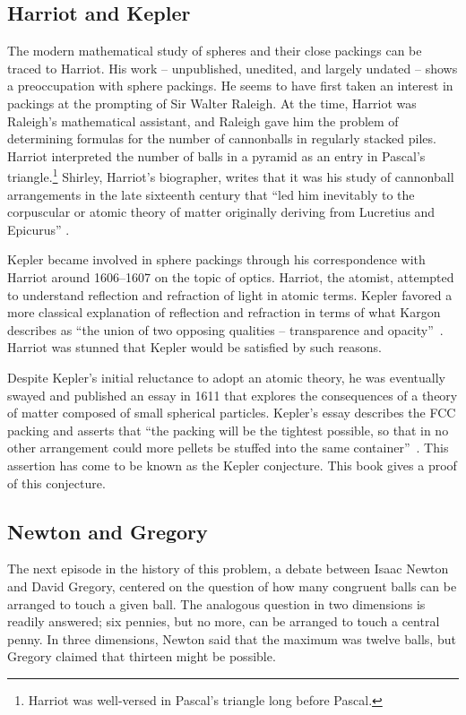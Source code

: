 \subsection{Harriot and Kepler}

The modern mathematical study of spheres and their close packings can
be traced to Harriot.  His work -- unpublished, unedited, and
largely undated -- shows a preoccupation with sphere packings.  He
seems to have first taken an interest in packings at the prompting of
Sir Walter Raleigh.  At the time, Harriot was Raleigh's mathematical
assistant, and Raleigh gave him the problem of determining formulas
for the number of cannonballs in regularly stacked piles.  Harriot
interpreted the number of balls in a pyramid as an entry in Pascal's
triangle.\footnote{Harriot was well-versed in Pascal's triangle long
  before Pascal.}  Shirley, Harriot's biographer, writes that it was
his study of cannonball arrangements in the late sixteenth century
that  ``led him inevitably to the corpuscular or atomic
theory of matter originally deriving from Lucretius and Epicurus''
\cite[p.~242]{Shi83}.

Kepler became involved in sphere packings through his correspondence
with Harriot around 1606--1607 on the topic of optics.
Harriot, the atomist, attempted to understand reflection and refraction
of light in atomic terms.  Kepler favored a more classical explanation of
reflection and refraction in terms of what Kargon describes as ``the union of two opposing
qualities -- transparence and opacity''~\cite[p.26]{Kar66}.  
Harriot was stunned that
Kepler would be satisfied by such reasons.

Despite Kepler's initial reluctance to adopt an atomic
theory, he was eventually swayed and  published an essay in  1611
that explores the consequences of a theory of matter composed of small
spherical particles. 
Kepler's essay describes the FCC packing and asserts
that ``the packing will be the tightest possible, so that in no other
arrangement could more pellets be stuffed into the same
container''~\cite{Kep66}.  This assertion has come to be known as the
Kepler conjecture.  This book
gives a proof of this conjecture.

\subsection{Newton and Gregory}

The next episode in the history of this problem,  a debate between
Isaac Newton and David Gregory,  centered on the
question of how many congruent balls  can be arranged to touch
a given ball.  The analogous question in two dimensions is readily answered;
six pennies, but no more, can be arranged
to touch a central penny.  In three dimensions, Newton said that the maximum was
twelve balls, but Gregory claimed that thirteen might be possible.

